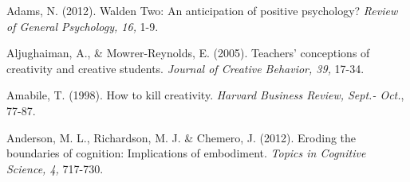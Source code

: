 \documentclass[a4paper,12pt,man,british]{apa6}
\begin{document}
 
 
\begin{description}
\setlength{\itemsep}{0mm}

\item Adams, N. (2012). Walden Two: An anticipation of positive psychology? {\it Review of General Psychology, 16,} 1-9.  



\item Aljughaiman, A., \& Mowrer-Reynolds, E. (2005). Teachers' conceptions of creativity and creative students. \emph{Journal of Creative Behavior, 39,} 17-34.


\item Amabile, T. (1998). How to kill creativity. \emph{Harvard Business Review, Sept.- Oct.}, 77-87. 

\item Anderson,  M. L., Richardson, M. J. \& Chemero, J. (2012). Eroding the boundaries of cognition: Implications of embodiment. \emph{Topics in Cognitive Science, 4,} 717-730.



\end{description}
\end{document}
